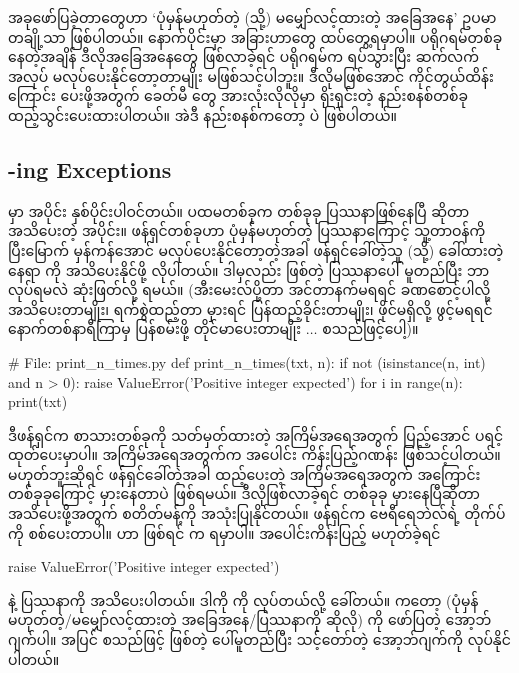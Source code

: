 အခုဖော်ပြခဲ့တာတွေဟာ ‘ပုံမှန်မဟုတ်တဲ့ (သို့) မမျှော်လင့်ထားတဲ့ အခြေအနေ’ ဥပမာတချို့သာ ဖြစ်ပါတယ်။ နောက်ပိုင်းမှာ အခြားဟာတွေ ထပ်တွေ့ရမှာပါ။ ပရိုဂရမ်တစ်ခု  နေတဲ့အချိန် ဒီလိုအခြေအနေတွေ ဖြစ်လာခဲ့ရင် ပရိုဂရမ်က ရပ်သွားပြီး ဆက်လက် အလုပ် မလုပ်ပေးနိုင်တော့တာမျိုး မဖြစ်သင့်ပါဘူး။ ဒီလိုမဖြစ်အောင် ကိုင်တွယ်ထိန်းကြောင်း ပေးဖို့အတွက် ခေတ်မီ  တွေ အားလုံးလိုလိုမှာ ရိုးရှင်းတဲ့ နည်းစနစ်တစ်ခု ထည့်သွင်းပေးထားပါတယ်။ အဲဒီ နည်းစနစ်ကတော့  ပဲ ဖြစ်ပါတယ်။

\subsection*{ -ing Exceptions}
 မှာ အပိုင်း နှစ်ပိုင်းပါဝင်တယ်။ ပထမတစ်ခုက တစ်ခုခု ပြဿနာဖြစ်နေပြီ ဆိုတာ အသိပေးတဲ့ အပိုင်း။ ဖန်ရှင်တစ်ခုဟာ ပုံမှန်မဟုတ်တဲ့ ပြဿနာကြောင့် သူ့တာဝန်ကို ပြီးမြောက် မှန်ကန်အောင် မလုပ်ပေးနိုင်တော့တဲ့အခါ ဖန်ရှင်ခေါ်တဲ့သူ (သို့) ခေါ်ထားတဲ့နေရာ ကို အသိပေးနိုင်ဖို့ လိုပါတယ်။ ဒါမှလည်း ဖြစ်တဲ့ ပြဿနာပေါ် မူတည်ပြီး ဘာလုပ်ရမလဲ ဆုံးဖြတ်လို့ ရမယ်။ (အီးမေးလ်ပို့တာ အင်တာနက်မရရင် ခဏစောင့်ပါလို့ အသိပေးတာမျိုး၊ ရက်စွဲထည့်တာ မှားရင် ပြန်ထည့်ခိုင်းတာမျိုး၊ ဖိုင်မရှိလို့ ဖွင့်မရရင် နောက်တစ်နာရီကြာမှ ပြန်စမ်းဖို့ တိုင်မာပေးတာမျိုး $\ldots$ စသည်ဖြင့်ပေါ့)။

%
\begin{py}
# File: print_n_times.py
def print_n_times(txt, n):
    if not (isinstance(n, int) and n > 0):
        raise ValueError('Positive integer expected')
    for i in range(n):
        print(txt)
\end{py}
%
ဒီဖန်ရှင်က စာသားတစ်ခုကို သတ်မှတ်ထားတဲ့ အကြိမ်အရေအတွက် ပြည့်အောင် ပရင့်ထုတ်ပေးမှာပါ။ အကြိမ်အရေအတွက်က အပေါင်း ကိန်းပြည့်ဂဏန်း ဖြစ်သင့်ပါတယ်။ မဟုတ်ဘူးဆိုရင် ဖန်ရှင်ခေါ်တဲ့အခါ ထည့်ပေးတဲ့ အကြိမ်အရေအတွက် အကြောင်းတစ်ခုခုကြောင့် မှားနေတာပဲ ဖြစ်ရမယ်။ ဒီလိုဖြစ်လာခဲ့ရင် တစ်ခုခု မှားနေပြီဆိုတာ အသိပေးဖို့အတွက်  စတိတ်မန့်ကို အသုံးပြုနိုင်တယ်။  ဖန်ရှင်က ဗေရီရေဘဲလ်ရဲ့ တိုက်ပ်ကို စစ်ပေးတာပါ။  ဟာ  ဖြစ်ရင်  က  ရမှာပါ။ အပေါင်းကိန်းပြည့် မဟုတ်ခဲ့ရင်
%
\begin{py}
raise ValueError('Positive integer expected')
\end{py}
%
နဲ့ ပြဿနာကို အသိပေးပါတယ်။ ဒါကို  ကို  လုပ်တယ်လို့ ခေါ်တယ်။  ကတော့  (ပုံမှန်မဟုတ်တဲ့/မမျှော်လင့်ထားတဲ့ အခြေအနေ/ပြဿနာကို ဆိုလို) ကို ဖော်ပြတဲ့ အော့ဘ်ဂျက်ပါ။  အပြင် \fEn{,}  စသည်ဖြင့် ဖြစ်တဲ့  ပေါ်မူတည်ပြီး သင့်တော်တဲ့ အော့ဘ်ဂျက်ကို  လုပ်နိုင်ပါတယ်။ 

